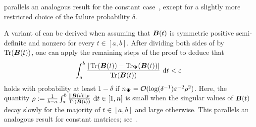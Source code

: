 %

 parallels an analogous result for the constant case~\cite[Lemma 2.1]{meyer-2021-hutch-optimal}, except for a slightly more restricted choice of the failure probability $\delta$.

\begin{remark}
    A variant of  can be derived when assuming that $\boldsymbol{B}(t)$ is symmetric positive semi-definite and nonzero for every $t \in [a, b]$. After dividing both sides of  by $\operatorname{Tr}(\boldsymbol{B}(t))$, one can apply the remaining steps of the proof to deduce that
    \begin{equation*}
        \int_{a}^{b} \frac{| \operatorname{Tr}(\boldsymbol{B}(t)) - \operatorname{Tr}_{\boldsymbol{\Psi}}(\boldsymbol{B}(t)) |}{\operatorname{Tr}(\boldsymbol{B}(t))} ~\mathrm{d}t < \varepsilon
    \end{equation*}
    holds with probability at least $1 - \delta$ if $n_{\boldsymbol{\Psi}} = \mathcal{O}(\log(\delta^{-1}) \varepsilon^{-2} \rho^2)$. Here, 
    the quantity $
        \rho := \frac{1}{b-a} \int_{a}^{b} \frac{\lVert \boldsymbol{B}(t) \rVert _F}{\operatorname{Tr}(\boldsymbol{B}(t))} ~\mathrm{d}t \in [1,n]
    $
is small when the singular values of $\boldsymbol{B}(t)$ decay slowly for the majority of $t\in [a,b]$ and large otherwise. This parallels an analogous result for constant matrices; see~\cite[Remark 2]{cortinovis-2022-randomized-trace}.
\end{remark}

